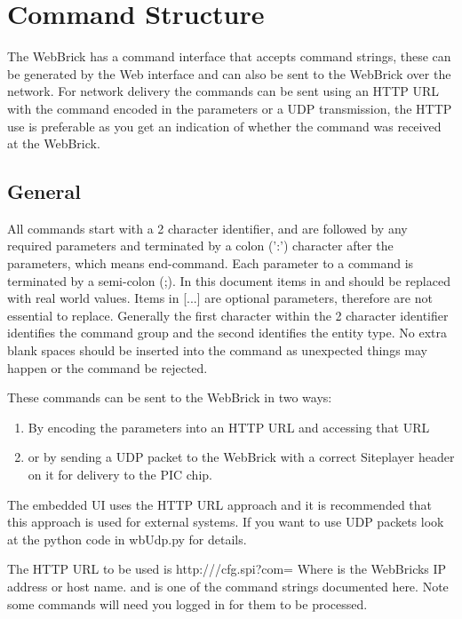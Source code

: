 \section {Command Structure}

The WebBrick has a command interface that accepts command strings, these can be generated
by the Web interface and can also be sent to the WebBrick over the network. For network delivery
the commands can be sent using an HTTP URL with the command encoded in the parameters or a UDP transmission,
the HTTP use is preferable as you get an indication of whether the command was received at the WebBrick.

\subsection{General}
All commands start with a 2 character identifier, and are followed by any required parameters and terminated 
by a colon (':') character after the parameters, 
which means end-command. Each parameter to a command is terminated by a semi-colon (;). In this document 
items in  
and should be replaced with real world values. Items in [...] are optional parameters, therefore are not essential to replace. Generally the first character within the 2 character 
identifier identifies the command group and the second identifies the entity type. No extra blank spaces should
be inserted into the command as unexpected things may happen or the command be rejected.

These commands can be sent to the WebBrick in two ways:

\begin{enumerate}
	\item By encoding the parameters into 
	an HTTP URL and accessing that URL
	\item or by sending a UDP packet to the WebBrick with a 
	correct Siteplayer header on it for delivery to the PIC chip. 
\end{enumerate}

The embedded UI uses the 
HTTP URL approach and it is recommended that this approach is used for external systems. If you want
to use UDP packets look at the python code in wbUdp.py for details.

The HTTP URL to be used is http:///cfg.spi?com=
Where  is the WebBricks IP address or host name.
and  is one of the command strings documented here. Note some commands will
need you logged in for them to be processed.

